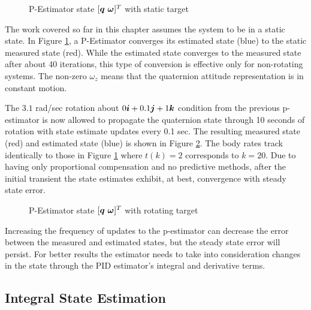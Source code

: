 \begin{figure}[H]
  \centerline{}
  \caption{P-Estimator state $[\bs{q}\ \bs{\omega}]^T$ with static target}
  \label{fig:PEstimatorwithstatictarget}
\end{figure}

The work covered so far in this chapter assumes the system to be in a static state.  In Figure \ref{fig:PEstimatorwithstatictarget}, a P-Estimator converges its estimated state (blue) to the static measured state (red).  While the estimated state converges to the measured state after about 40 iterations, this type of conversion is effective only for non-rotating systems.  The non-zero $\omega_z$ means that the quaternion attitude representation is in constant motion.

The $3.1$ rad/sec rotation about $0\boldsymbol{i} + 0.1\boldsymbol{j} + 1\boldsymbol{k}$ condition from the previous p-estimator is now allowed to propagate the quaternion state through 10 seconds of rotation with state estimate updates every 0.1 sec.  The resulting measured state (red) and estimated state (blue) is shown in Figure \ref{fig:PEstimatorwithrotatingtarget}.  The body rates track identically to those in Figure \ref{fig:PEstimatorwithstatictarget} where $t(k) = 2$ corresponds to $k = 20$.  Due to having only proportional compensation and no predictive methods, after the initial transient the state estimates exhibit, at best, convergence with steady state error.

\begin{figure}[H]
  \centerline{}
  \caption{P-Estimator state $[\bs{q}\ \bs{\omega}]^T$  with rotating target}
  \label{fig:PEstimatorwithrotatingtarget}
\end{figure}

Increasing the frequency of updates to the p-estimator can decrease the error between the measured and estimated states, but the steady state error will persist.  For better results the estimator needs to take into consideration changes in the state through the PID estimator's integral and derivative terms.

\subsection{Integral State Estimation}
\label{subsec:IntegralEstimator}


